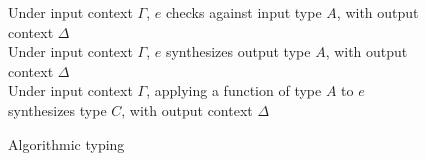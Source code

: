 \def\OPTIONConf{1}




\begin{figure*}[htbp]
     {Under input context $\Gamma$, $e$ checks against input type $A$, 
     with output context $\Delta$} \\[1ex]
     {Under input context $\Gamma$, $e$ synthesizes output type $A$,
       with output context $\Delta$} \\[1ex]
     {Under input context $\Gamma$, applying a function of type $A$ to $e$ synthesizes type $C$, with output context $\Delta$} \\
  \small{}
  \caption{Algorithmic typing}
\end{figure*}


\restoregeometry